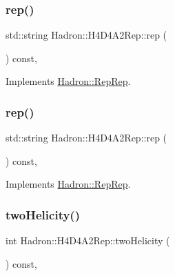 \subsubsection{\texorpdfstring{rep()}{rep()}\hspace{0.1cm}{\footnotesize\ttfamily [2/3]}}
{\footnotesize\ttfamily std\+::string Hadron\+::\+H4\+D4\+A2\+Rep\+::rep (\begin{DoxyParamCaption}{ }\end{DoxyParamCaption}) const\hspace{0.3cm}{\ttfamily [inline]}, {\ttfamily [virtual]}}



Implements \mbox{\hyperlink{structHadron_1_1RepRep_ab3213025f6de249f7095892109575fde}{Hadron\+::\+Rep\+Rep}}.

\mbox{\label{structHadron_1_1H4D4A2Rep_a3964a2a2df9370ac3176d54fa588eb8a}} 
\subsubsection{\texorpdfstring{rep()}{rep()}\hspace{0.1cm}{\footnotesize\ttfamily [3/3]}}
{\footnotesize\ttfamily std\+::string Hadron\+::\+H4\+D4\+A2\+Rep\+::rep (\begin{DoxyParamCaption}{ }\end{DoxyParamCaption}) const\hspace{0.3cm}{\ttfamily [inline]}, {\ttfamily [virtual]}}



Implements \mbox{\hyperlink{structHadron_1_1RepRep_ab3213025f6de249f7095892109575fde}{Hadron\+::\+Rep\+Rep}}.

\mbox{\label{structHadron_1_1H4D4A2Rep_a6ea29d2750a22f6ef02172b0482e32e5}} 
\subsubsection{\texorpdfstring{twoHelicity()}{twoHelicity()}\hspace{0.1cm}{\footnotesize\ttfamily [1/2]}}
{\footnotesize\ttfamily int Hadron\+::\+H4\+D4\+A2\+Rep\+::two\+Helicity (\begin{DoxyParamCaption}{ }\end{DoxyParamCaption}) const\hspace{0.3cm}{\ttfamily [inline]}, {\ttfamily [virtual]}}

